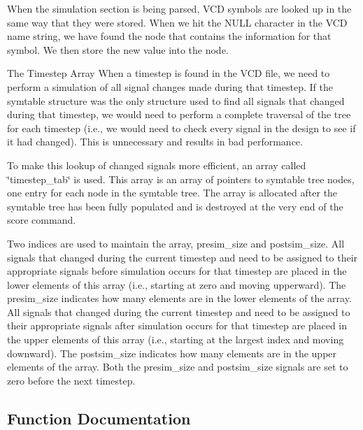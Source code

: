 \begin{Desc}
\item[]When the simulation section is being parsed, VCD symbols are looked up in the same way that they were stored. When we hit the NULL character in the VCD name string, we have found the node that contains the information for that symbol. We then store the new value into the node.\end{Desc}
\begin{Desc}
\item[The Timestep Array]When a timestep is found in the VCD file, we need to perform a simulation of all signal changes made during that timestep. If the symtable structure was the only structure used to find all signals that changed during that timestep, we would need to perform a complete traversal of the tree for each timestep (i.e., we would need to check every signal in the design to see if it had changed). This is unnecessary and results in bad performance.\end{Desc}
\begin{Desc}
\item[]To make this lookup of changed signals more efficient, an array called \char`\"{}timestep\_\-tab\char`\"{} is used. This array is an array of pointers to symtable tree nodes, one entry for each node in the symtable tree. The array is allocated after the symtable tree has been fully populated and is destroyed at the very end of the score command.\end{Desc}
\begin{Desc}
\item[]Two indices are used to maintain the array, presim\_\-size and postsim\_\-size. All signals that changed during the current timestep and need to be assigned to their appropriate signals before simulation occurs for that timestep are placed in the lower elements of this array (i.e., starting at zero and moving upperward). The presim\_\-size indicates how many elements are in the lower elements of the array. All signals that changed during the current timestep and need to be assigned to their appropriate signals after simulation occurs for that timestep are placed in the upper elements of this array (i.e., starting at the largest index and moving downward). The postsim\_\-size indicates how many elements are in the upper elements of the array. Both the presim\_\-size and postsim\_\-size signals are set to zero before the next timestep.\end{Desc}


\subsection{Function Documentation}
